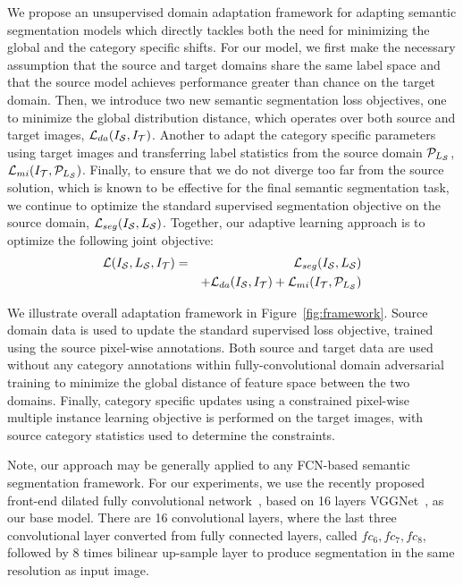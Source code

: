 \documentclass[10pt,twocolumn,letterpaper]{article}
\begin{document}
We propose an unsupervised domain adaptation framework for adapting semantic segmentation models which directly tackles both the need for minimizing the global and the category specific shifts. For our model, we first make the necessary assumption that the source and target domains share the same label space and that the source model achieves performance greater than chance on the target domain. Then, we introduce two new semantic segmentation loss objectives, one to minimize the global distribution distance, which operates over both source and target images, $\mathcal{L}_{da}({I}_{\mathcal{S}}, {I}_{\mathcal{T}})$.  Another to adapt the category specific parameters using target images and transferring label statistics from the source domain $\mathcal{P}_{L_{\mathcal{S}}}$, $\mathcal{L}_{mi}({I}_{\mathcal{T}}, \mathcal{P}_{L_{\mathcal{S}}})$. Finally, to ensure that we do not diverge too far from the source solution, which is known to be effective for the final semantic segmentation task, we continue to optimize the standard supervised segmentation objective on the source domain, $\mathcal{L}_{seg}({I}_{\mathcal{S}}, L_{\mathcal{S}})$. Together, our adaptive learning approach is to optimize the following joint objective: 
\begin{eqnarray}
	\mathcal{L}({I}_{\mathcal{S}}, L_{\mathcal{S}}, {I}_{\mathcal{T}}) &=& \mathcal{L}_{seg}({I}_{\mathcal{S}}, L_{\mathcal{S}}) \\
	&& + \mathcal{L}_{da}({I}_{\mathcal{S}}, {I}_{\mathcal{T}}) + \mathcal{L}_{mi}({I}_{\mathcal{T}}, \mathcal{P}_{L_{\mathcal{S}}}) \nonumber
\end{eqnarray}

We illustrate overall adaptation framework in Figure~\ref{fig:framework}. Source domain data is used to update the standard supervised loss objective, trained using the source pixel-wise annotations. Both source and target data are used without any category annotations within fully-convolutional domain adversarial training to minimize the global distance of feature space between the two domains. Finally, category specific updates using a constrained pixel-wise multiple instance learning objective is performed on the target images, with source category statistics used to determine the constraints. 











Note, our approach may be generally applied to any FCN-based semantic segmentation framework. For our experiments, we use the recently proposed front-end dilated fully convolutional network~\cite{yu2016multi}, based on 16 layers VGGNet~\cite{simonyan2015very}, as our base model. There are 16 convolutional layers, where the last three convolutional layer converted from fully connected layers, called $fc_6, fc_7, fc_8$, followed by $8$ times bilinear up-sample layer to produce segmentation in the same resolution as input image.
\end{document}
